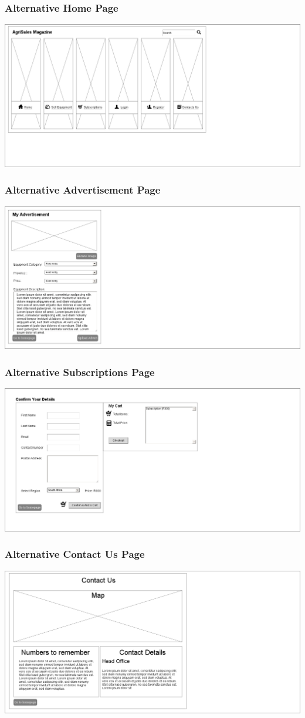 \documentclass[11pt]{article}
\begin{document}
	\subsubsection{Alternative Home Page}
		\includegraphics[width=0.75\linewidth]{../Images/AgriSales-AlternativeHomePage}
		
	\subsubsection{Alternative Advertisement Page}
		\includegraphics[width=0.75\linewidth]{../Images/AgriSales-AlternativeAdvertisementPage}
		
	\subsubsection{Alternative Subscriptions Page}
		\includegraphics[width=0.75\linewidth]{../Images/AgriSales-AlternativeSubscriptionsPage}
		
	\subsubsection{Alternative Contact Us Page}
		\includegraphics[width=0.75\linewidth]{../Images/AgriSale-AlternativeContactUsPage}
\end{document}
